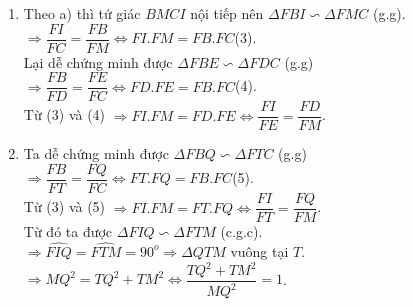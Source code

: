 \begin{ex}
{\begin{enumerate}
$\Rightarrow B,C,I,M$ cùng thuộc một đường tròn\qquad (2).\\
Từ (1) và (2) $\Rightarrow B,M,O,I,C$ cùng thuộc đường tròn đường kính $OM$.
\item Theo a) thì tứ giác $BMCI$ nội tiếp nên $\Delta FBI\backsim\Delta FMC$ (g.g).\\
$\Rightarrow \dfrac{FI}{FC}=\dfrac{FB}{FM}\Leftrightarrow FI.FM=FB.FC$\qquad (3).\\
Lại dễ chứng minh được $\Delta FBE\backsim \Delta FDC$ (g.g)\\
$\Rightarrow \dfrac{FB}{FD}=\dfrac{FE}{FC}\Leftrightarrow FD.FE=FB.FC$\qquad (4).\\
Từ (3) và (4) $\Rightarrow FI.FM=FD.FE\Leftrightarrow \dfrac{FI}{FE}=\dfrac{FD}{FM}$.
\item Ta dễ chứng minh được $\Delta FBQ\backsim\Delta FTC$ (g.g)\\
$\Rightarrow \dfrac{FB}{FT}=\dfrac{FQ}{FC}\Leftrightarrow FT.FQ=FB.FC$\qquad (5).\\
Từ (3) và (5) $\Rightarrow FI.FM=FT.FQ\Leftrightarrow\dfrac{FI}{FT}=\dfrac{FQ}{FM}$.\\
Từ đó ta được $\Delta FIQ\backsim\Delta FTM$ (c.g.c).\\
$\Rightarrow \widehat{FIQ}=\widehat{FTM}=90^o\Rightarrow \Delta QTM$ vuông tại $T$.\\
$\Rightarrow MQ^2=TQ^2+TM^2\Leftrightarrow\dfrac{TQ^2+TM^2}{MQ^2}=1$. 
\end{enumerate}
}
\end{ex}


